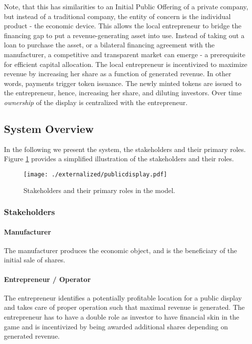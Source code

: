 Note, that this has similarities to an Initial Public Offering of a private company, but instead of a traditional company, the entity of concern is the individual product - the economic device.
This allows the local entrepreneur to bridge the financing gap to put a revenue-generating asset into use. Instead of taking out a loan to purchase the asset, or a bilateral financing agreement with the manufacturer, a competitive and transparent market can emerge - a prerequisite for efficient capital allocation.
The local entrepreneur is incentivized to maximize revenue by increasing her share as a function of generated revenue. In other words, payments trigger token issuance. The newly minted tokens are issued to the entrepreneur, hence, increasing her share, and diluting investors. Over time \emph{ownership} of the display is centralized with the entrepreneur. 

\subsection{System Overview}

In the following we present the system, the stakeholders and their primary roles. Figure \ref{fig:smartproperty} provides a simplified illustration of the stakeholders and their roles. 

\begin{figure}[!t]
    \centering
    \texttt{[image: ./externalized/publicdisplay.pdf]}
    \caption{Stakeholders and their primary roles in the model.}
    \label{fig:smartproperty}
  \end{figure}

\subsubsection{Stakeholders}

\paragraph{Manufacturer}

The manufacturer produces the economic object, and is the beneficiary of the initial sale of shares.

\paragraph{Entrepreneur / Operator}

The entrepreneur identifies a potentially profitable location for a public display and takes care of proper operation such that maximal revenue is generated. The entrepreneur has to have a double role as investor to have financial skin in the game and is incentivized by being awarded additional shares depending on generated revenue.

